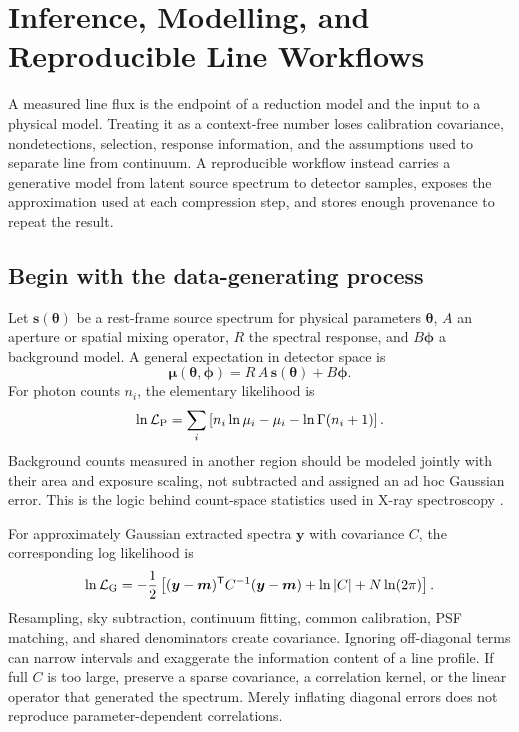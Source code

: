 \chapter[Inference and Reproducible Workflows]{Inference, Modelling, and Reproducible Line Workflows}
\label{ch:inference}

A measured line flux is the endpoint of a reduction model and the input to a
physical model.  Treating it as a context-free number loses calibration
covariance, nondetections, selection, response information, and the assumptions
used to separate line from continuum.  A reproducible workflow instead carries
a generative model from latent source spectrum to detector samples, exposes the
approximation used at each compression step, and stores enough provenance to
repeat the result.

\section{Begin with the data-generating process}

Let $\boldsymbol{s}(\boldsymbol{\theta})$ be a rest-frame source spectrum for
physical parameters $\boldsymbol{\theta}$, $A$ an aperture or spatial mixing
operator, $R$ the spectral response, and $B\boldsymbol{\phi}$ a background model.
A general expectation in detector space is
\begin{equation}
 \boldsymbol{\mu}(\boldsymbol{\theta},\boldsymbol{\phi})
 =R\,A\,\boldsymbol{s}(\boldsymbol{\theta})+B\boldsymbol{\phi}.
 \label{eq:forward-model}
\end{equation}
For photon counts $n_i$, the elementary likelihood is
\begin{equation}
 \ln \mathcal{L}_{\rm P}=\sum_i
 \left[n_i\ln\mu_i-\mu_i-\ln\Gamma(n_i+1)\right].
 \label{eq:poisson-likelihood}
\end{equation}
Background counts measured in another region should be modeled jointly with
their area and exposure scaling, not subtracted and assigned an ad hoc Gaussian
error.  This is the logic behind count-space statistics used in X-ray
spectroscopy \citep{Cash1979,Arnaud1996}.

For approximately Gaussian extracted spectra $\boldsymbol{y}$ with covariance
$C$, the corresponding log likelihood is
\begin{equation}
 \ln\mathcal{L}_{\rm G}=-\frac{1}{2}
 \left[(\boldsymbol{y}-\boldsymbol{m})^{\mathsf T}C^{-1}
 (\boldsymbol{y}-\boldsymbol{m})+\ln|C|+N\ln(2\pi)\right].
 \label{eq:gaussian-covariance}
\end{equation}
Resampling, sky subtraction, continuum fitting, common calibration, PSF
matching, and shared denominators create covariance.  Ignoring off-diagonal
terms can narrow intervals and exaggerate the information content of a line
profile.  If full $C$ is too large, preserve a sparse covariance, a correlation
kernel, or the linear operator that generated the spectrum.  Merely inflating
diagonal errors does not reproduce parameter-dependent correlations.

